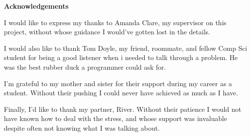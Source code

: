 \thispagestyle{empty}

\begin{center}
    {\LARGE\bf Acknowledgements}
\end{center}

I would like to express my thanks to Amanda Clare, my supervisor on this project, without whose guidance I would've gotten lost in the details.

I would also like to thank Tom Doyle, my friend, roommate, and fellow Comp Sci student for being a good listener when i needed to talk through a problem. He was the best rubber duck a programmer could ask for.

I'm grateful to my mother and sister for their support during my career as a student. Without their pushing I could never have achieved as much as I have.

Finally, I'd like to thank my partner, River. Without their patience I would not have known how to deal with the stress, and whose support was invaluable despite often not knowing what I was talking about.